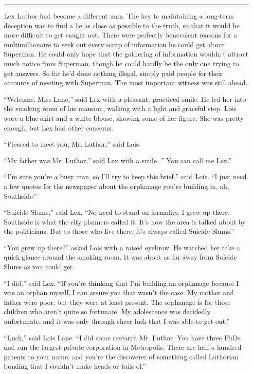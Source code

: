 \documentclass[ebook,12pt]{memoir}
\begin{document}
\begin{center}\rule{0.5\linewidth}{0.5pt}\end{center}

Lex Luthor had become a different man. The key to maintaining a
long‐term deception was to find a lie as close as possible to the truth,
so that it would be more difficult to get caught out. There were
perfectly benevolent reasons for a multimillionaire to seek out every
scrap of information he could get about Superman. He could only hope
that the gathering of information wouldn't attract much notice from
Superman, though he could hardly be the only one trying to get answers.
So far he'd done nothing illegal, simply paid people for their accounts
of meeting with Superman. The most important witness was still ahead.

``Welcome, Miss Lane,'' said Lex with a pleasant, practiced smile. He
led her into the smoking room of his mansion, walking with a light and
graceful step. Lois wore a blue skirt and a white blouse, showing some
of her figure. She was pretty enough, but Lex had other concerns.

``Pleased to meet you, Mr. Luthor,'' said Lois.

``My father was Mr. Luthor,'' said Lex with a smile. '' You can call me
Lex.''

``I'm sure you're a busy man, so I'll try to keep this brief,'' said
Lois. ``I just need a few quotes for the newspaper about the orphanage
you're building in, ah, Southside.''

``Suicide Slums,'' said Lex. ``No need to stand on formality, I grew up
there. Southside is what the city planners called it. It's how the area
is talked about by the politicians. But to those who live there, it's
always called Suicide Slums.''

``You grew up there?'' asked Lois with a raised eyebrow. He watched her
take a quick glance around the smoking room. It was about as far away
from Suicide Slums as you could get.

``I did,'' said Lex. ``If you're thinking that I'm building an orphanage
because I was an orphan myself, I can assure you that wasn't the case.
My mother and father were poor, but they were at least present. The
orphanage is for those children who aren't quite so fortunate. My
adolescence was decidedly unfortunate, and it was only through sheer
luck that I was able to get out.''

``Luck,'' said Lois Lane. ``I did some research Mr. Luthor. You have
three PhDs and run the largest private corporation in Metropolis. There
are half a hundred patents to your name, and you're the discoverer of
something called Luthorian bonding that I couldn't make heads or tails
of.''
\end{document}
